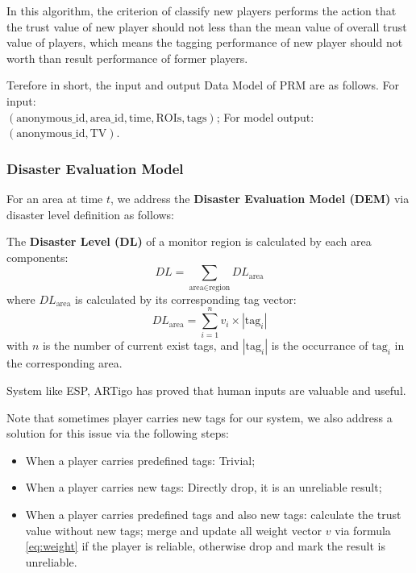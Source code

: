   In this algorithm, the criterion of classify new players performs the action that 
  the trust value of new player should not less than the mean value of overall trust value of players, 
  which means the tagging performance of new player should not worth than result performance of former players.
  
  Terefore in short, the input and output Data Model of PRM are as follows. For input:\\
  $(\text{anonymous\_id}, \text{area\_id}, \text{time}, \text{ROIs}, \text{tags})$; 
  For model output: 
  $(\text{anonymous\_id}, \text{TV})$.

  \subsubsection{Disaster Evaluation Model}
  \label{chapter:dem}

  For an area at time $t$, we address the \textbf{Disaster Evaluation Model (DEM)} 
  via disaster level definition as follows:

  \begin{definition}
  \label{def:dl}
  The \textbf{Disaster Level (DL)} of a monitor region is calculated by each area components:
  \[
    DL = \sum_{\text{area}\in\text{region}}{DL_{\text{area}}}
  \]
  where $DL_{\text{area}}$ is calculated by its corresponding tag vector:
  \[
    DL_{\text{area}} = \sum_{i=1}^{n}{v_i \times |\text{tag}_i|}
  \]
  with $n$ is the number of current exist tags, and $|\text{tag}_i|$ is the occurrance of $\text{tag}_i$
  in the corresponding area.
  \end{definition}

  System like ESP\cite{von2004labeling}, ARTigo\cite{wieser2013artigo} has proved that 
  human inputs are valuable and useful.

  Note that sometimes player carries new tags for our system, we also address a solution 
  for this issue via the following steps:

  \begin{itemize}
  \item When a player carries predefined tags: Trivial;
  \item When a player carries new tags: Directly drop, it is an unreliable result;
  \item When a player carries predefined tags and also new tags: calculate the trust value without new tags;
   merge and update all weight vector $v$ via formula \ref{eq:weight} if the player is reliable, 
   otherwise drop and mark the result is unreliable.
  \end{itemize}

